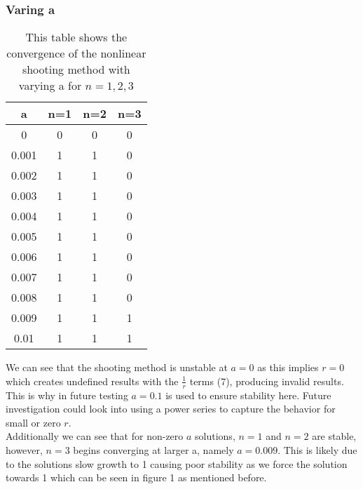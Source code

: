 \documentclass{article}
\begin{document}
\subsubsection{Varing a}
\begin{table}[H]
\centering
\caption{This table shows the convergence of the nonlinear shooting method with varying a for $n=1,2,3$}
\begin{tabular}{|c|c|c|c|}
\hline
a & n=1 & n=2 & n=3 \\
\hline
0 & 0 & 0 & 0\\
0.001 & 1 & 1 & 0\\
0.002 & 1 & 1 & 0\\
0.003 & 1 & 1 & 0\\
0.004 & 1 & 1 & 0\\
0.005 & 1 & 1 & 0\\
0.006 & 1 & 1 & 0\\
0.007 & 1 & 1 & 0\\
0.008 & 1 & 1 & 0\\
0.009 & 1 & 1 & 1\\
0.01  & 1 & 1 & 1\\
\hline
\end{tabular}
\end{table}
We can see that the shooting method is unstable at $a=0$ as this implies $r=0$ which creates undefined results with the $\frac{1}{r}$ terms (7), producing invalid results. This is why in future testing $a=0.1$ is used to ensure stability here. Future investigation could look into using a power series to capture the behavior for small or zero $r$. \\
Additionally we can see that for non-zero $a$ solutions, $n=1$ and $n=2$ are stable, however, $n=3$ begins converging at larger a, namely $a=0.009$. This is likely due to the solutions slow growth to 1 causing poor stability as we force the solution towards 1 which can be seen in figure 1 as mentioned before. 
\end{document}

